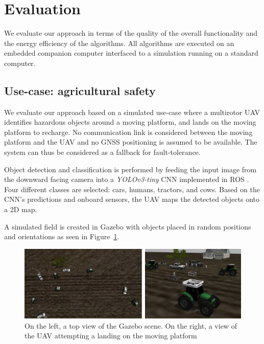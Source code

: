 \documentclass[conference, onecolumn, draftclsnofoot]{IEEEtran}
\begin{document}
\section{Evaluation}
\label{sec:experimental}

We evaluate our approach in terms of the quality of the overall
functionality and the energy efficiency of the algorithms. All
algorithms are executed on an embedded companion computer interfaced
to a simulation running on a standard computer.

\subsection{Use-case: agricultural safety}

We evaluate our approach based on a simulated use-case where %
a multirotor UAV identifies
hazardous objects around a moving platform, and lands on the
moving platform to recharge.
%
%
No communication link is considered between the moving platform and the UAV
and no GNSS positioning is assumed to be available. The system can thus be
considered as a fallback for fault-tolerance.


Object detection and classification is performed by feeding the input
image from the downward facing camera into a \emph{YOLOv3-tiny} CNN
\cite{yolov3} implemented in ROS \cite{bjelonicYolo2018}. Four
different classes are selected: cars, humans, tractors, and
cows. Based on the CNN's predictions and onboard
sensors, the UAV maps the detected objects onto a 2D map.
 

A simulated field is created in Gazebo with objects placed in random
positions and orientations as seen in Figure~\ref{fig:Gazebo}.

\begin{figure}[t]
\centering
\includegraphics[scale=0.2]{gazebo_scalled.png}
\caption{On the left, a top view of the Gazebo scene. 
On the right, a view of the UAV attempting a landing on the moving platform }
\label{fig:Gazebo}
\end{figure}
\end{document}
